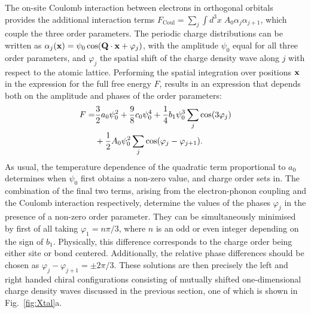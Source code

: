 \documentclass[aps,prl,twocolumn,superscriptaddress,groupedaddress]{revtex4}
\begin{document}
The on-site Coulomb interaction between electrons in orthogonal orbitals provides the additional interaction terms $F_{\text{Coul}} = \sum_{j} \int d^3 x \; A_0 \alpha_j \alpha_{j+1}$, which couple the three order parameters. The periodic charge distributions can be written as $\alpha_j( {\bf x}) = \psi_0 \cos( {\bf Q} \cdot {\bf x} + \varphi_j )$, with the amplitude $\psi_0$ equal for all three order parameters, and $\varphi_j$ the spatial shift of the charge density wave along $j$ with respect to the atomic lattice. Performing the spatial integration over positions ${\bf x}$ in the expression for the full free energy $F$, results in an expression that depends both on the amplitude and phases of the order parameters:
\begin{align}
F  =& \frac{3}{2} a_0 \psi_0^2 + \frac{9}{8} c_0 \psi_0^4  + \frac{1}{4} b_1 \psi_0^3  \sum_j \cos(3\varphi_j) \notag \\ 
& + \frac{1}{2} A_0 \psi_0^2 \sum_{j} \cos(\varphi_j - \varphi_{j+1}).
\label{GL}
\end{align}
As usual, the temperature dependence of the quadratic term proportional to $a_0$ determines when $\psi_0$ first obtains a non-zero value, and charge order sets in. The combination of the final two terms, arising from the electron-phonon coupling and the Coulomb interaction respectively, determine the values of the phases $\varphi_j$ in the presence of a non-zero order parameter. They can be simultaneously minimised by first of all taking $\varphi_1=n \pi/3$, where $n$ is an odd or even integer depending on the sign of $b_1$. Physically, this difference corresponds to the charge order being either site or bond centered. Additionally, the relative phase differences should be chosen as $\varphi_j - \varphi_{j+1} = \pm 2\pi/3$. These solutions are then precisely the left and right handed chiral configurations consisting of mutually shifted one-dimensional charge density waves discussed in the previous section, one of which is shown in Fig.~\ref{fig:Xtal}a.
\end{document}
